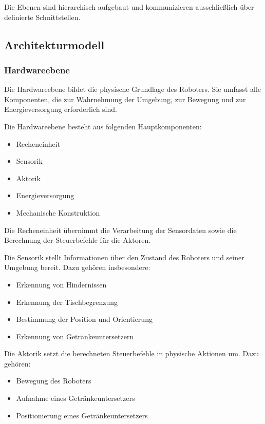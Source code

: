 \documentclass[
  a4paper,
  12pt,
  DIV=12,        %
  parskip=half,  %
  headings=small %
]{scrartcl}
\theoremstyle{definition}
\providecommand{\tightlist}{%
  \setlength{\itemsep}{0pt}\setlength{\parskip}{0pt}}
\theoremstyle{definition}
\begin{document}
Die Ebenen sind hierarchisch aufgebaut und kommunizieren ausschließlich
über definierte Schnittstellen.

\subsection{Architekturmodell}\label{architekturmodell}

\subsubsection{Hardwareebene}\label{hardwareebene-1}

Die Hardwareebene bildet die physische Grundlage des Roboters. Sie
umfasst alle Komponenten, die zur Wahrnehmung der Umgebung, zur Bewegung
und zur Energieversorgung erforderlich sind.

Die Hardwareebene besteht aus folgenden Hauptkomponenten:

\begin{itemize}
\tightlist
\item
  Recheneinheit
\item
  Sensorik
\item
  Aktorik
\item
  Energieversorgung
\item
  Mechanische Konstruktion
\end{itemize}

Die Recheneinheit übernimmt die Verarbeitung der Sensordaten sowie die
Berechnung der Steuerbefehle für die Aktoren.

Die Sensorik stellt Informationen über den Zustand des Roboters und
seiner Umgebung bereit. Dazu gehören insbesondere:

\begin{itemize}
\tightlist
\item
  Erkennung von Hindernissen
\item
  Erkennung der Tischbegrenzung
\item
  Bestimmung der Position und Orientierung
\item
  Erkennung von Getränkeuntersetzern
\end{itemize}

Die Aktorik setzt die berechneten Steuerbefehle in physische Aktionen
um. Dazu gehören:

\begin{itemize}
\tightlist
\item
  Bewegung des Roboters
\item
  Aufnahme eines Getränkeuntersetzers
\item
  Positionierung eines Getränkeuntersetzers
\end{itemize}
\end{document}
